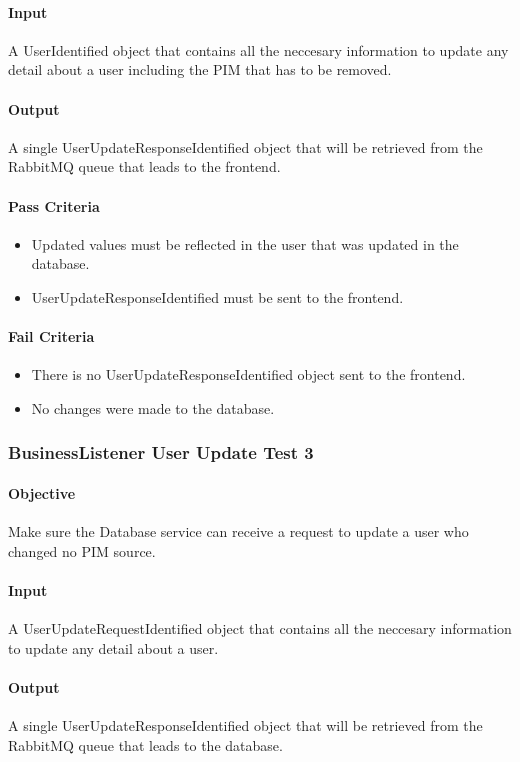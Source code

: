\documentclass[hidelinks,english]{article}
\begin{document}
				\paragraph{Input} A UserIdentified object that contains all the neccesary information to update any detail about a user including the PIM that has to be removed.
				\paragraph{Output} A single UserUpdateResponseIdentified object that will be retrieved from the RabbitMQ queue that leads to the frontend.
				\paragraph{Pass Criteria}
				\begin{itemize}
					\item Updated values must be reflected in the user that was updated in the database.
					\item UserUpdateResponseIdentified must be sent to the frontend.
				\end{itemize}
				\paragraph{Fail Criteria}
				\begin{itemize}
					\item There is no UserUpdateResponseIdentified object sent to the frontend.
					\item No changes were made to the database.
				\end{itemize}
				
			\subsubsection{BusinessListener User Update Test 3}\label{databasebusinesslistenerupdatetest3}
				\paragraph{Objective} Make sure the Database service can receive a request to update a user who changed no PIM source.
				\paragraph{Input} A UserUpdateRequestIdentified object that contains all the neccesary information to update any detail about a user.
				\paragraph{Output} A single UserUpdateResponseIdentified object that will be retrieved from the RabbitMQ queue that leads to the database.
\end{document}
